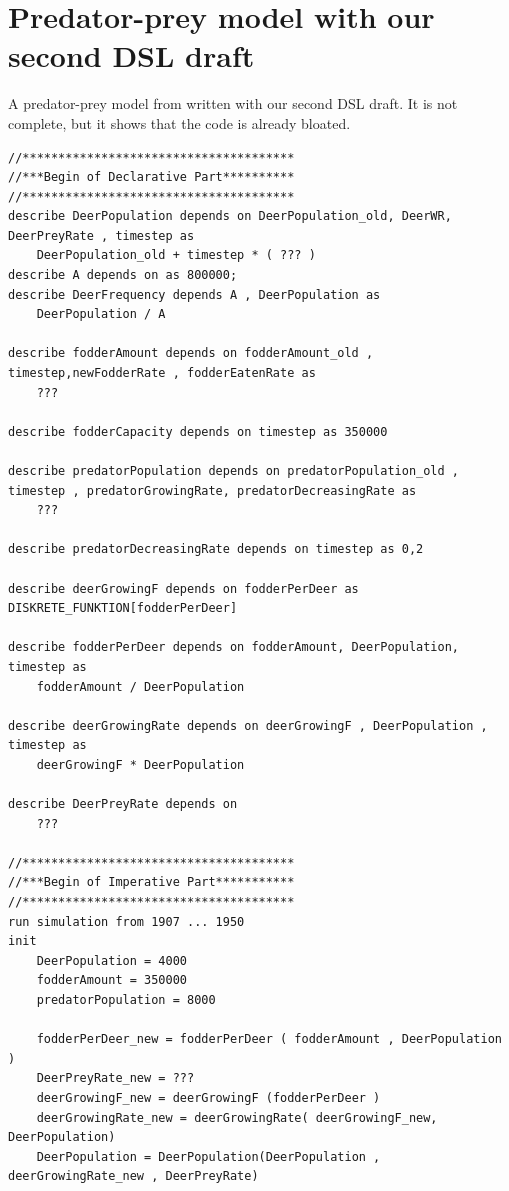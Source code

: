 \section{Predator-prey model with our second DSL draft} \label{sec:second_dsl_draft}
\par
A predator-prey model from \autocite{dsl:dynamo} written with our second DSL draft. It is not complete, but it shows that the code is already bloated.
\newline
\begin{lstlisting}[language=secondDSL]
//**************************************
//***Begin of Declarative Part**********
//**************************************
describe DeerPopulation depends on DeerPopulation_old, DeerWR, DeerPreyRate , timestep as
	DeerPopulation_old + timestep * ( ??? )
describe A depends on as 800000;
describe DeerFrequency depends A , DeerPopulation as
	DeerPopulation / A  

describe fodderAmount depends on fodderAmount_old , timestep,newFodderRate , fodderEatenRate as
	???

describe fodderCapacity depends on timestep as 350000

describe predatorPopulation depends on predatorPopulation_old , timestep , predatorGrowingRate, predatorDecreasingRate as
	???

describe predatorDecreasingRate depends on timestep as 0,2

describe deerGrowingF depends on fodderPerDeer as DISKRETE_FUNKTION[fodderPerDeer]

describe fodderPerDeer depends on fodderAmount, DeerPopulation, timestep as
	fodderAmount / DeerPopulation

describe deerGrowingRate depends on deerGrowingF , DeerPopulation , timestep as
	deerGrowingF * DeerPopulation

describe DeerPreyRate depends on
	???

//**************************************
//***Begin of Imperative Part***********
//**************************************
run simulation from 1907 ... 1950
init
	DeerPopulation = 4000
	fodderAmount = 350000
	predatorPopulation = 8000

	fodderPerDeer_new = fodderPerDeer ( fodderAmount , DeerPopulation )
	DeerPreyRate_new = ???
	deerGrowingF_new = deerGrowingF (fodderPerDeer )
	deerGrowingRate_new = deerGrowingRate( deerGrowingF_new, DeerPopulation)
	DeerPopulation = DeerPopulation(DeerPopulation , deerGrowingRate_new , DeerPreyRate)
\end{lstlisting}

















 







